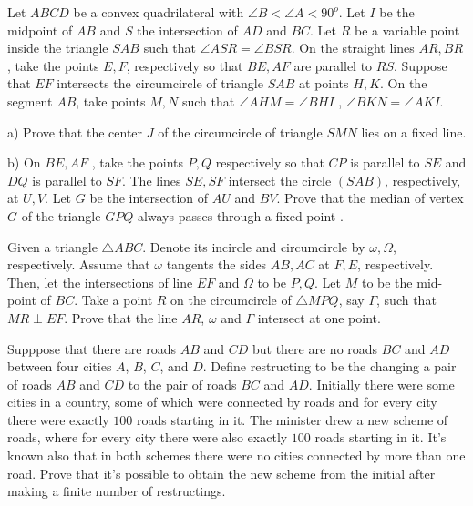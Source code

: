 \documentclass[11pt]{scrartcl}
\begin{document}
\begin{problem}[1613309914397651478]
Let $ABCD$ be a convex quadrilateral with $\angle B < \angle A < 90^{o}$. Let $I$ be the midpoint of $AB$ and $S$ the intersection of $AD$ and $BC$. Let $R$ be a variable point inside the triangle $SAB$ such that $\angle ASR = \angle BSR$. On the straight lines $AR, BR$ , take the points $E, F$, respectively so that $BE , AF$ are parallel to $RS$. Suppose that $EF$ intersects the circumcircle of triangle $SAB$ at points $H, K$. On the segment $AB$, take points $M , N$ such that $\angle AHM =\angle BHI$ , $\angle BKN = \angle AKI$.

a) Prove that the center $J$ of the circumcircle of triangle $SMN$ lies on a fixed line.

b) On $BE, AF$ , take the points $P, Q$ respectively so that $CP$ is parallel to $SE$ and $DQ$ is parallel to $SF$. The lines $SE, SF$ intersect the circle $(SAB)$, respectively, at $U, V$. Let $G$ be the intersection of $AU$ and $BV$. Prove that the median of vertex $G$ of the triangle $GPQ$ always passes through a fixed point .
\end{problem}
\begin{problem}[1965233157265405983]
Given a triangle $ \triangle{ABC} $. Denote its incircle and circumcircle by $ \omega, \Omega $, respectively. Assume that $ \omega $ tangents the sides $ AB, AC $ at $ F, E $, respectively. Then, let the intersections of line $ EF $ and $ \Omega $ to be $ P,Q $. Let $ M $ to be the mid-point of $ BC $. Take a point $ R $ on the circumcircle of $ \triangle{MPQ} $, say $ \Gamma $, such that $ MR \perp EF $. Prove that the line $ AR $, $ \omega $ and $ \Gamma $ intersect at one point.
\end{problem}
\begin{problem}[4875666253256352039]
Supppose that there are roads $AB$ and $CD$ but there are no roads $BC$ and $AD$ between four cities $A$, $B$, $C$, and $D$. Define restructing to be the changing a pair of roads $AB$ and $CD$ to the pair of roads $BC$ and $AD$. Initially there were some cities in a country, some of which were connected by roads and for every city there were exactly $100$ roads starting in it. The minister drew a new scheme of roads, where for every city there were also exactly $100$ roads starting in it. It's known also that in both schemes there were no cities connected by more than one road.
Prove that it's possible to obtain the new scheme from the initial after making a finite number of restructings.
\end{problem}
\end{document}
